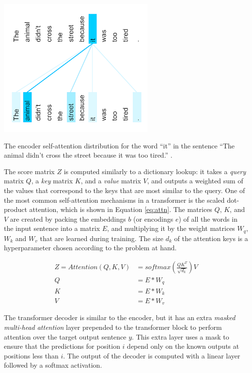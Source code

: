 \begin{table}[!h]
    \centering
    \includegraphics[width=0.6\columnwidth]{imgs/background/attn.png}
    \caption{The encoder self-attention distribution for the word ``it'' in the sentence
    ``The animal didn't cross the street because it was too tired.'' \cite{vaswani2017attention}.}
    \label{fig:attn}
\end{table}

The score matrix $Z$ is computed similarly to a dictionary lookup: it takes a \textit{query} matrix $Q$, a \textit{key} matrix $K$, and a \textit{value} matrix $V$, and outputs a weighted sum of the values that correspond to the keys that are most similar to the query. One of the most common self-attention mechanisms in a transformer is the scaled dot-product attention, which is shown in Equation \ref{eq:attn}. The matrices $Q$, $K$, and $V$ are created by packing the embeddings $b$ (or encodings $e$) of all the words in the input sentence into a matrix $E$, and multiplying it by the weight matrices $W_q$, $W_k$ and $W_v$ that are learned during training. The size $d_k$ of the attention keys is a hyperparameter chosen according to the problem at hand.

\begin{equation}\label{eq:attn}
\begin{split}
    Z = Attention(Q, K, V) &= softmax(\frac{QK^T}{\sqrt{d_k}})V \\
    Q &= E * W_q \\
    K &= E * W_k \\
    V &= E * W_v
\end{split}
\end{equation}

The transformer decoder is similar to the encoder, but it has an extra \textit{masked multi-head attention} layer prepended to the transformer block to perform attention over the target output sentence $y$. This extra layer uses a mask to ensure that the predictions for position $i$ depend only on the known outputs at positions less than $i$. The output of the decoder is computed with a linear layer followed by a softmax activation.

